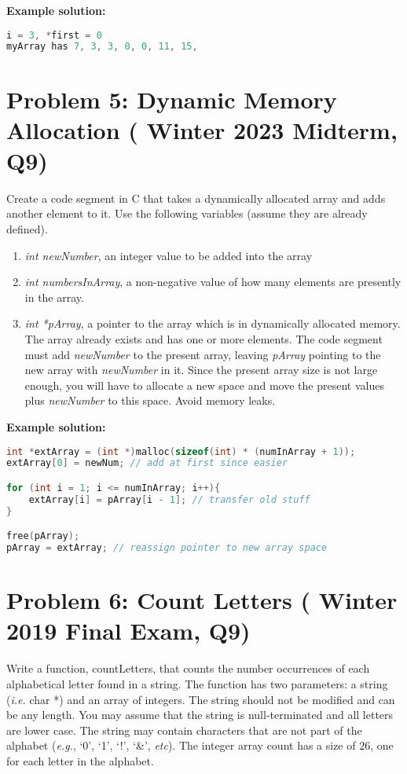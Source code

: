 \documentclass[12pt]{article}
\begin{document}
\textbf{Example solution:}
\begin{lstlisting}[language=C]
i = 3, *first = 0
myArray has 7, 3, 3, 0, 0, 11, 15,
\end{lstlisting}

\section*{Problem 5:  Dynamic Memory Allocation ( Winter 2023 Midterm, Q9)}

Create a code segment in C that takes a dynamically allocated array and adds another element to it. Use the following variables (assume they are already defined).
\begin{enumerate}
	\item \textit{int newNumber}, an integer value to be added into the array
	\item \textit{ int numbersInArray}, a non-negative value of how many elements are presently in the array.
	\item \textit{int *pArray}, a pointer to the array which is in dynamically allocated memory. The array already exists and has one or more elements. The code segment must add \textit{newNumber} to the present array, leaving \textit{pArray} pointing to the new array with \textit{newNumber} in it. Since the present array size is not large enough, you will have to allocate a new space and move the present values plus \textit{newNumber} to this space. Avoid memory leaks.
\end{enumerate}

\textbf{Example solution:}
\begin{lstlisting}[language=C]
int *extArray = (int *)malloc(sizeof(int) * (numInArray + 1));
extArray[0] = newNum; // add at first since easier

for (int i = 1; i <= numInArray; i++){
	extArray[i] = pArray[i - 1]; // transfer old stuff
}

free(pArray);
pArray = extArray; // reassign pointer to new array space
\end{lstlisting}

\section*{Problem 6: Count Letters ( Winter 2019 Final Exam, Q9)}

Write a function, countLetters, that counts the number occurrences of each alphabetical letter found in a string. The function has two parameters: a string (\textit{i.e.} char *) and an array of integers. The string should not be modified and can be any length. You may assume that the string is null-terminated and all letters are lower case. The string may contain characters that are not part of the alphabet (\textit{e.g.}, `0’, `1’, `!’, `\&’, \textit{etc}). The integer array count has a size of $26$, one for each letter in the alphabet.
\end{document}
